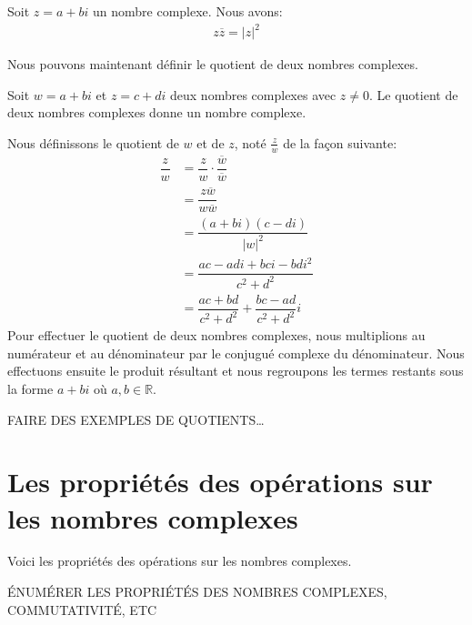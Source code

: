 \documentclass[]{book}
\theoremstyle{definition}
\theoremstyle{definition}
\theoremstyle{definition}
\theoremstyle{remark}
\let\BeginKnitrBlock\begin \let\EndKnitrBlock\end
\begin{document}
\BeginKnitrBlock{theorem}
\protect\hypertarget{thm:unnamed-chunk-156}{}{\label{thm:unnamed-chunk-156} }Soit \(z=a+bi\) un nombre complexe. Nous avons:
\begin{align*}
z\overline{z} = \vert z\vert^2
\end{align*}
\EndKnitrBlock{theorem}

Nous pouvons maintenant définir le quotient de deux nombres complexes.

\BeginKnitrBlock{definition}
\protect\hypertarget{def:unnamed-chunk-157}{}{\label{def:unnamed-chunk-157} }Soit \(w=a+bi\) et \(z=c+di\) deux nombres complexes avec \(z\neq 0\). Le quotient de deux nombres complexes donne un nombre complexe.

Nous définissons le quotient de \(w\) et de \(z\), noté \(\frac{z}{w}\) de la façon suivante:
\begin{align*}
\dfrac{z}{w} &= \dfrac{z}{w}\cdot \dfrac{\overline{w}}{\overline{w}} \\
&= \dfrac{z\overline{w}}{w\overline{w}} \\
&= \dfrac{(a+bi)(c-di)}{\vert w\vert^2}  \\
&= \dfrac{ac-adi+bci-bdi^2}{c^2+d^2} \\
&= \dfrac{ac+bd}{c^2+d^2} + \dfrac{bc-ad}{c^2+d^2}i
\end{align*}
Pour effectuer le quotient de deux nombres complexes, nous multiplions au numérateur et au dénominateur par le conjugué complexe du dénominateur. Nous effectuons ensuite le produit résultant et nous regroupons les termes restants sous la forme \(a+bi\) où \(a,b\in\mathbb{R}\).
\EndKnitrBlock{definition}

\BeginKnitrBlock{example}
\protect\hypertarget{exm:unnamed-chunk-158}{}{\label{exm:unnamed-chunk-158} }FAIRE DES EXEMPLES DE QUOTIENTS\ldots{}
\EndKnitrBlock{example}

\hypertarget{les-propriuxe9tuxe9s-des-opuxe9rations-sur-les-nombres-complexes}{%
\section{Les propriétés des opérations sur les nombres complexes}\label{les-propriuxe9tuxe9s-des-opuxe9rations-sur-les-nombres-complexes}}

Voici les propriétés des opérations sur les nombres complexes.

\BeginKnitrBlock{theorem}
\protect\hypertarget{thm:unnamed-chunk-159}{}{\label{thm:unnamed-chunk-159} }ÉNUMÉRER LES PROPRIÉTÉS DES NOMBRES COMPLEXES, COMMUTATIVITÉ, ETC
\EndKnitrBlock{theorem}
\end{document}
